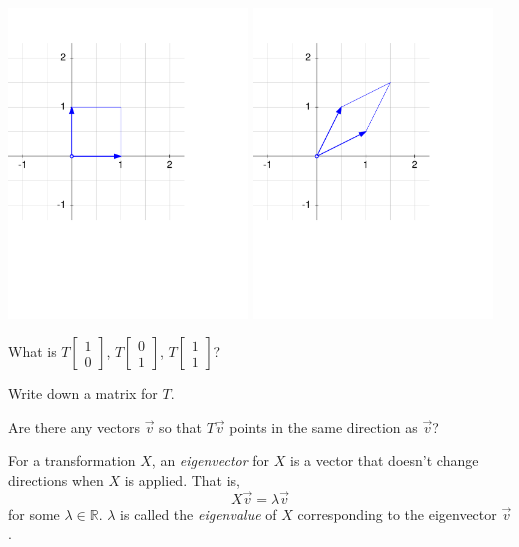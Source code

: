 \documentclass{article}
\newcommand{\R}{\mathbb{R}}
\newcommand{\mat}[1]{\begin{bmatrix}#1\end{bmatrix}}
\begin{document}
	\includegraphics[width=2.5in]{transform1b.pdf}
	\includegraphics[width=2.5in]{transform2b.pdf}


	\vspace{-6em}
	\begin{Enum}
		\item What is $T\mat{1\\0}$, $T\mat{0\\1}$, $T\mat{1\\1}$?
		\item Write down a matrix for $T$.
		\item Are there any vectors $\vec v$ so that $T\vec v$ points in the
			same direction as $\vec v$?
	\end{Enum}
	
	\begin{Def}
	For a transformation $X$, an \emph{eigenvector} for $X$ is a vector that doesn't
	change directions when $X$ is applied.  That is,
	\[
		X\vec v=\lambda \vec v
	\]
	for some $\lambda\in\R$.  $\lambda$ is called the \emph{eigenvalue} 
	of $X$ corresponding
	to the eigenvector $\vec v$.
	\end{Def}
\end{document}
